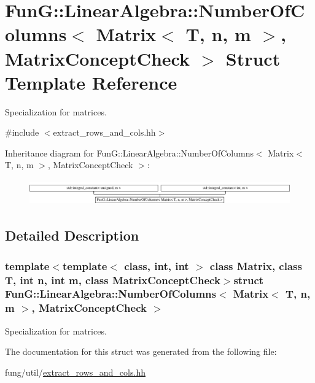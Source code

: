 \hypertarget{structFunG_1_1LinearAlgebra_1_1NumberOfColumns_3_01Matrix_3_01T_00_01n_00_01m_01_4_00_01MatrixConceptCheck_01_4}{}\section{Fun\+G\+:\+:Linear\+Algebra\+:\+:Number\+Of\+Columns$<$ Matrix$<$ T, n, m $>$, Matrix\+Concept\+Check $>$ Struct Template Reference}
\label{structFunG_1_1LinearAlgebra_1_1NumberOfColumns_3_01Matrix_3_01T_00_01n_00_01m_01_4_00_01MatrixConceptCheck_01_4}


Specialization for matrices.  




{\ttfamily \#include $<$extract\+\_\+rows\+\_\+and\+\_\+cols.\+hh$>$}

Inheritance diagram for Fun\+G\+:\+:Linear\+Algebra\+:\+:Number\+Of\+Columns$<$ Matrix$<$ T, n, m $>$, Matrix\+Concept\+Check $>$\+:\begin{figure}[H]
\begin{center}
\leavevmode
\includegraphics[height=1.117764cm]{structFunG_1_1LinearAlgebra_1_1NumberOfColumns_3_01Matrix_3_01T_00_01n_00_01m_01_4_00_01MatrixConceptCheck_01_4}
\end{center}
\end{figure}


\subsection{Detailed Description}
\subsubsection*{template$<$template$<$ class, int, int $>$ class Matrix, class T, int n, int m, class Matrix\+Concept\+Check$>$struct Fun\+G\+::\+Linear\+Algebra\+::\+Number\+Of\+Columns$<$ Matrix$<$ T, n, m $>$, Matrix\+Concept\+Check $>$}

Specialization for matrices. 

The documentation for this struct was generated from the following file\+:\begin{DoxyCompactItemize}
\item 
fung/util/\hyperlink{extract__rows__and__cols_8hh}{extract\+\_\+rows\+\_\+and\+\_\+cols.\+hh}\end{DoxyCompactItemize}
